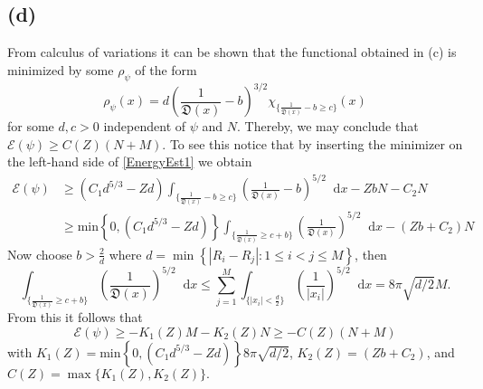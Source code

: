 \documentclass[a4paper,11pt]{article}
\newcommand{\abs}[1]{\left\lvert #1 \right\rvert}
\newcommand*\diff{\mathop{}\!\mathrm{d}}
\numberwithin{equation}{section}
\begin{document}
 \subsection*{(d)}
 From calculus of variations it can be shown that the functional obtained in (c) is minimized by some $ \rho_\psi $ of the form \begin{equation}
 \rho_{\psi}(x)=d\left(\frac{1}{\mathfrak{D}(x)}-b\right)^{3/2}\chi_{\{\frac{1}{\mathfrak{D}(x)}-b\geq c\}}(x)
 \end{equation}
 for some $ d,c>0 $ independent of $ \psi $ and $ N $. Thereby, we may conclude that $ \mathcal{E}(\psi)\geq C(Z)(N+M) $. To see this notice that by inserting the minimizer on the left-hand side of \eqref{EnergyEst1} we obtain \begin{equation}\begin{aligned}
 \mathcal{E}(\psi)&\geq (C_1d^{5/3}-Zd)\int_{\{\frac{1}{\mathfrak{D}(x)}-b\geq c\}}\left(\frac{1}{\mathfrak{D}(x)}-b\right)^{5/2}\diff x-ZbN-C_2N\\&\geq\text{min}\left\{0,(C_1d^{5/3}-Zd)\right\}\int_{\{\frac{1}{\mathfrak{D}(x)}\geq c+b\}}\left(\frac{1}{\mathfrak{D}(x)}\right)^{5/2}\diff x-(Zb+C_2)N
 \end{aligned}
 \end{equation}
 Now choose $ b>\frac{2}{d} $ where $ d=\min\left\{\abs{R_i-R_j}:1\leq i<j\leq M\right\} $, then \begin{equation}
 \int_{\{\frac{1}{\mathfrak{D}(x)}\geq c+b\}}\left(\frac{1}{\mathfrak{D}(x)}\right)^{5/2}\diff x\leq\sum_{j=1}^{M}\int_{\{\abs{x_i}< \frac{d}{2}\}}\left(\frac{1}{\abs{x_i}}\right)^{5/2}\diff x=8\pi\sqrt{d/2} M.
 \end{equation}
 From this it follows that \begin{equation}
 \mathcal{E}(\psi)\geq -K_1(Z)M-K_2(Z)N\geq-C(Z)(N+M)
 \end{equation}
 with $ K_1(Z)=\text{min}\left\{0,(C_1d^{5/3}-Zd)\right\}8\pi\sqrt{d/2} $, $ K_2(Z)=(Zb+C_2) $, and\\ $C(Z)=\max\{K_1(Z),K_2(Z)\}.  $
\end{document}
